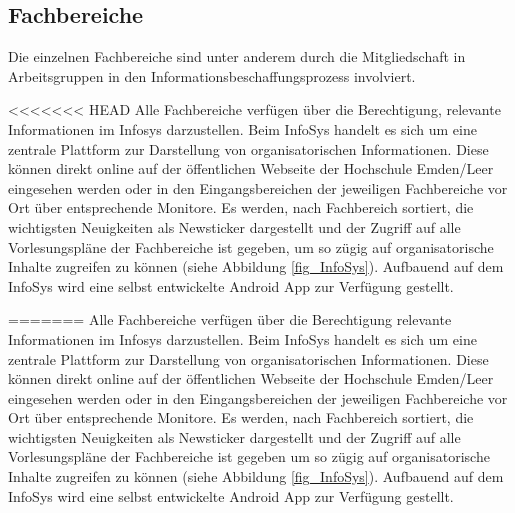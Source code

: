 \subsection{Fachbereiche}
Die einzelnen Fachbereiche sind unter anderem durch die Mitgliedschaft in Arbeitsgruppen in den Informationsbeschaffungsprozess involviert.

<<<<<<< HEAD
Alle Fachbereiche verfügen über die Berechtigung, relevante Informationen im Infosys darzustellen. Beim InfoSys handelt es sich um eine zentrale Plattform zur Darstellung von organisatorischen Informationen. Diese können direkt online auf der öffentlichen Webseite der Hochschule Emden/Leer eingesehen werden oder in den Eingangsbereichen der jeweiligen Fachbereiche vor Ort über entsprechende Monitore. Es werden, nach Fachbereich sortiert, die wichtigsten Neuigkeiten als Newsticker dargestellt und der Zugriff auf alle Vorlesungspläne der Fachbereiche ist gegeben, um so zügig auf organisatorische Inhalte zugreifen zu können (siehe Abbildung \ref{fig_InfoSys}). Aufbauend auf dem InfoSys wird eine selbst entwickelte Android App zur Verfügung gestellt.

=======
Alle Fachbereiche verfügen über die Berechtigung relevante Informationen im Infosys darzustellen. Beim InfoSys handelt es sich um eine zentrale Plattform zur Darstellung von organisatorischen Informationen. Diese können direkt online auf der öffentlichen Webseite der Hochschule Emden/Leer eingesehen werden oder in den Eingangsbereichen der jeweiligen Fachbereiche vor Ort über entsprechende Monitore. Es werden, nach Fachbereich sortiert, die wichtigsten Neuigkeiten als Newsticker dargestellt und der Zugriff auf alle Vorlesungspläne der Fachbereiche ist gegeben um so zügig auf organisatorische Inhalte zugreifen zu können (siehe Abbildung \ref{fig_InfoSys}). Aufbauend auf dem InfoSys wird eine selbst entwickelte Android App zur Verfügung gestellt.

